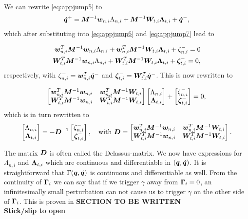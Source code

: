 \documentclass[DC2017114Bouma.tex]{subfiles}
\begin{document}
We can rewrite \eqref{eq:appjump5} to
\begin{align}
\dot{{\boldsymbol{q}}}^+ = {\boldsymbol{M}}^{-1}{\boldsymbol{w}}_{n,i}\Lambda_{n,i} + {\boldsymbol{M}}^{-1}{\boldsymbol{W}}_{t,i}\boldsymbol{\Lambda}_{t,i} + \dot{{\boldsymbol{q}}}^-,
\end{align}
which after substituting into \eqref{eq:appjump6} and \eqref{eq:appjump7} lead to

\begin{align}
{\boldsymbol{w}}_{n,i}^T{\boldsymbol{M}}^{-1}{\boldsymbol{w}}_{n,i}\Lambda_{n,i} + {\boldsymbol{w}}_{n,i}^T{\boldsymbol{M}}^{-1}{\boldsymbol{W}}_{t,i}\boldsymbol{\Lambda}_{t,i} + \zeta_{n,i}^- = 0\\
{\boldsymbol{W}}_{t,i}^T{\boldsymbol{M}}^{-1}{\boldsymbol{w}}_{n,i}\Lambda_{n,i} + {\boldsymbol{W}}_{t,i}^T{\boldsymbol{M}}^{-1}{\boldsymbol{W}}_{t,i}\boldsymbol{\Lambda}_{t,i} + \boldsymbol{\zeta}_{t,i}^- = 0,
\end{align}
respectively, with $\zeta_{n,i}^- = {\boldsymbol{w}}_{n,i}^T\dot{{\boldsymbol{q}}}^-$ and $\boldsymbol{\zeta}_{t,i}^- = {\boldsymbol{W}}_{t,i}^T\dot{{\boldsymbol{q}}}^-$. This is now rewritten to

\begin{align}
\begin{bmatrix}
{\boldsymbol{w}}_{n,i}^T{\boldsymbol{M}}^{-1}{\boldsymbol{w}}_{n,i} & {\boldsymbol{w}}_{n,i}^T{\boldsymbol{M}}^{-1}{\boldsymbol{W}}_{t,i} \\
{\boldsymbol{W}}_{t,i}^T{\boldsymbol{M}}^{-1}{\boldsymbol{w}}_{n,i} & {\boldsymbol{W}}_{t,i}^T{\boldsymbol{M}}^{-1}{\boldsymbol{W}}_{t,i}
\end{bmatrix}
\begin{bmatrix}
\Lambda_{n,i}\\
\boldsymbol{\Lambda}_{t,i}
\end{bmatrix} + \begin{bmatrix}
\zeta_{n,i}^-\\
\boldsymbol{\zeta}_{t,i}^-
\end{bmatrix}
= 0,
\end{align}
which is in turn rewritten to
\begin{align}
\begin{bmatrix}
\Lambda_{n,i}\\
\boldsymbol{\Lambda}_{t,i}
\end{bmatrix} = - {\boldsymbol{D}}^{-1}\begin{bmatrix}
\zeta_{n,i}^-\\
\boldsymbol{\zeta}_{t,i}^-
\end{bmatrix},\quad \text{with } {\boldsymbol{D}} = \begin{bmatrix}
{\boldsymbol{w}}_{n,i}^T{\boldsymbol{M}}^{-1}{\boldsymbol{w}}_{n,i} & {\boldsymbol{w}}_{n,i}^T{\boldsymbol{M}}^{-1}{\boldsymbol{W}}_{t,i} \\
{\boldsymbol{W}}_{t,i}^T{\boldsymbol{M}}^{-1}{\boldsymbol{w}}_{n,i} & {\boldsymbol{W}}_{t,i}^T{\boldsymbol{M}}^{-1}{\boldsymbol{W}}_{t,i}
\end{bmatrix}.
\end{align}

The matrix ${\boldsymbol{D}}$ is often called the Delassus-matrix. We now have expressions for $\Lambda_{n,i}$ and $\boldsymbol{\Lambda}_{t,i}$ which are continuous and differentiable in $({\boldsymbol{q}},\dot{{\boldsymbol{q}}})$. It is straightforward that $\Gamma({\boldsymbol{q}},\dot{{\boldsymbol{q}}})$ is continuous and differentiable as well. From the continuity of $\boldsymbol{\Gamma}_i$ we can say that if we trigger $\gamma$ away from $\boldsymbol{\Gamma}_i = 0$, an infinitesimally small perturbation can not cause us to trigger $\gamma$ on the other side of $\boldsymbol{\Gamma}_i$. This is proven in \textbf{SECTION TO BE WRITTEN}\\
\textbf{Stick/slip to open}\\
\end{document}

